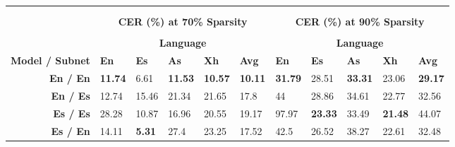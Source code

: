 \iffalse
\begin{table}
\centering
\begin{tabular}{lllllllllll}
& \\ \cline{2-11} \\[-2.3ex] 
& \multicolumn{5}{c}{\textbf{CER (\%) at 70\% Sparsity}} & \multicolumn{5}{|c}{\textbf{CER (\%) at 90\% Sparsity}} \\[0.75ex] \cline{2-11} \\[-2.35ex]
& \multicolumn{5}{c}{\textbf{Language}}  & \multicolumn{5}{|c}{\textbf{Language}} \\[0.5ex] \hline
\multicolumn{1}{l|}{\textbf{Model / Subnet}} & \multicolumn{1}{l}{\textbf{En}} & \multicolumn{1}{l}{\textbf{Es}} & \multicolumn{1}{l}{\textbf{As}} & \multicolumn{1}{l}{\textbf{Xh}} & \multicolumn{1}{l}{\textbf{Avg}} & \multicolumn{1}{|l}{\textbf{En}} & \multicolumn{1}{l}{\textbf{Es}} & \multicolumn{1}{l}{\textbf{As}} & \multicolumn{1}{l}{\textbf{Xh}} & \multicolumn{1}{l}{\textbf{Avg}} \\ \hline
\multicolumn{1}{r|}{\textbf{En / En}} & \multicolumn{1}{l}{\textbf{11.74}} & \multicolumn{1}{l}{6.61} & \multicolumn{1}{l}{\textbf{11.53}} & \multicolumn{1}{l}{\textbf{10.57}} & \textbf{10.11} & \multicolumn{1}{|l}{\textbf{31.79}} & \multicolumn{1}{l}{28.51} & \multicolumn{1}{l}{\textbf{33.31}} & \multicolumn{1}{l}{{23.06}} & \textbf{29.17} \\ %
\multicolumn{1}{r|}{\textbf{En / Es}} & \multicolumn{1}{l}{12.74} & \multicolumn{1}{l}{15.46} & \multicolumn{1}{l}{21.34} & \multicolumn{1}{l}{21.65} & 17.8 & \multicolumn{1}{|l}{44} & \multicolumn{1}{l}{28.86} & \multicolumn{1}{l}{34.61} & \multicolumn{1}{l}{{22.77}} & 32.56 \\ %
\multicolumn{1}{r|}{\textbf{Es / Es}} & \multicolumn{1}{l}{{28.28}} & \multicolumn{1}{l}{10.87} & \multicolumn{1}{l}{16.96} & \multicolumn{1}{l}{20.55} & 19.17 & \multicolumn{1}{|l}{{97.97}} & \multicolumn{1}{l}{\textbf{23.33}} & \multicolumn{1}{l}{33.49} & \multicolumn{1}{l}{\textbf{21.48}} & 44.07 \\ %
\multicolumn{1}{r|}{\textbf{Es / En}} & \multicolumn{1}{l}{14.11} & \multicolumn{1}{l}{\textbf{5.31}} & \multicolumn{1}{l}{27.4} & \multicolumn{1}{l}{23.25} & 17.52 & \multicolumn{1}{|l}{42.5} & \multicolumn{1}{l}{{26.52}} & \multicolumn{1}{l}{38.27} & \multicolumn{1}{l}{22.61} & 32.48 \\ \hline

\end{tabular}
\end{table}
